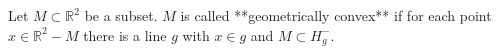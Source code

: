 Let $M \subset \mathbb{R}^2$ be a subset. $M$ is called **geometrically convex** if for each point $x \in \mathbb{R}^2 - M$ there is a line $g$ with $x \in g$ and $M \subset H_g^-$.
